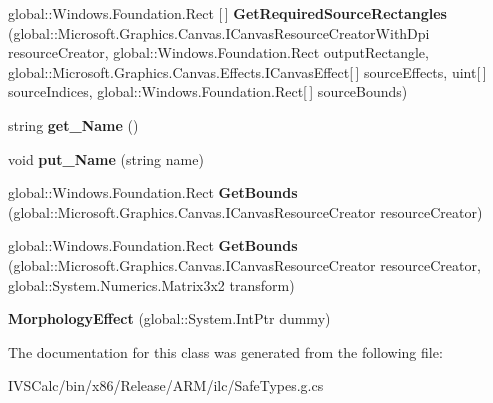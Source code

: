 \begin{DoxyCompactItemize}
\item 
\mbox{\label{class_microsoft_1_1_graphics_1_1_canvas_1_1_effects_1_1_morphology_effect_ae5cb1c08b61a18405e9dfbaa88fa5ed5}} 
global\+::\+Windows.\+Foundation.\+Rect \mbox{[}$\,$\mbox{]} {\bfseries Get\+Required\+Source\+Rectangles} (global\+::\+Microsoft.\+Graphics.\+Canvas.\+I\+Canvas\+Resource\+Creator\+With\+Dpi resource\+Creator, global\+::\+Windows.\+Foundation.\+Rect output\+Rectangle, global\+::\+Microsoft.\+Graphics.\+Canvas.\+Effects.\+I\+Canvas\+Effect\mbox{[}$\,$\mbox{]} source\+Effects, uint\mbox{[}$\,$\mbox{]} source\+Indices, global\+::\+Windows.\+Foundation.\+Rect\mbox{[}$\,$\mbox{]} source\+Bounds)
\item 
\mbox{\label{class_microsoft_1_1_graphics_1_1_canvas_1_1_effects_1_1_morphology_effect_a255bc7bed18329d2c61fac107439dea6}} 
string {\bfseries get\+\_\+\+Name} ()
\item 
\mbox{\label{class_microsoft_1_1_graphics_1_1_canvas_1_1_effects_1_1_morphology_effect_a013f5c2e209a17200348842a621476bf}} 
void {\bfseries put\+\_\+\+Name} (string name)
\item 
\mbox{\label{class_microsoft_1_1_graphics_1_1_canvas_1_1_effects_1_1_morphology_effect_a4cc93d1ce89bb136bf248b44ce57e0cc}} 
global\+::\+Windows.\+Foundation.\+Rect {\bfseries Get\+Bounds} (global\+::\+Microsoft.\+Graphics.\+Canvas.\+I\+Canvas\+Resource\+Creator resource\+Creator)
\item 
\mbox{\label{class_microsoft_1_1_graphics_1_1_canvas_1_1_effects_1_1_morphology_effect_af73df5ff1be6441e88acfd8ace44c35a}} 
global\+::\+Windows.\+Foundation.\+Rect {\bfseries Get\+Bounds} (global\+::\+Microsoft.\+Graphics.\+Canvas.\+I\+Canvas\+Resource\+Creator resource\+Creator, global\+::\+System.\+Numerics.\+Matrix3x2 transform)
\item 
\mbox{\label{class_microsoft_1_1_graphics_1_1_canvas_1_1_effects_1_1_morphology_effect_a2d9ece50b1dd157dfb4ba3fd5a775b2b}} 
{\bfseries Morphology\+Effect} (global\+::\+System.\+Int\+Ptr dummy)
\end{DoxyCompactItemize}


The documentation for this class was generated from the following file\+:\begin{DoxyCompactItemize}
\item 
I\+V\+S\+Calc/bin/x86/\+Release/\+A\+R\+M/ilc/Safe\+Types.\+g.\+cs\end{DoxyCompactItemize}
